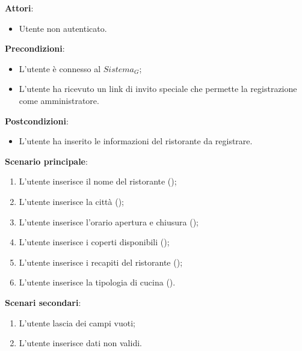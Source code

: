 \textbf{Attori}:
\begin{itemize}
    \item Utente non autenticato.
\end{itemize}
\textbf{Precondizioni}:
\begin{itemize}
    \item L'utente è connesso al $\textit{Sistema}_G$;
    \item L'utente ha ricevuto un link di invito speciale che permette la registrazione come amministratore.
\end{itemize}
\textbf{Postcondizioni}:
\begin{itemize}
    \item L'utente ha inserito le informazioni del ristorante da registrare.
\end{itemize}
\textbf{Scenario principale}:
\begin{enumerate}
    \item L'utente inserisce il nome del ristorante ();
    \item L'utente inserisce la città (); 
    \item L'utente inserisce l'orario apertura e chiusura ();
    \item L'utente inserisce i coperti disponibili ();
    \item L'utente inserisce i recapiti del ristorante ();
    \item L'utente inserisce la tipologia di cucina ().
\end{enumerate}
\textbf{Scenari secondari}:
    \begin{enumerate}
        \item L'utente lascia dei campi vuoti;
        \item L'utente inserisce dati non validi.
    \end{enumerate}

